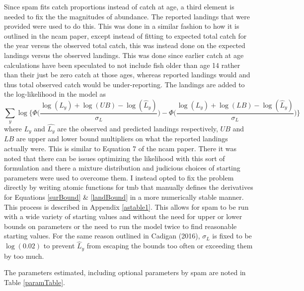 \documentclass[11pt]{article}\usepackage[]{graphicx}\usepackage[]{color}
\begin{document}
Since \acrshort{spam} fits catch proportions instead of catch at age, a third element is needed to fix the the magnitudes of abundance. The reported landings that were provided were used to do this. This was done in a similar fashion to how it is outlined in the \acrshort{ncam} paper, except instead of fitting to expected total catch for the year versus the observed total catch, this was instead done on the expected landings versus the observed landings. This was done since earlier catch at age calculations have been speculated to not include fish older than age 14 rather than their just be zero catch at those ages, whereas reported landings would and thus total observed catch would be under-reporting. The landings are added to the log-likelihood in the model as
\begin{equation}\label{landBound}
  \sum_y \log\bigg\{\Phi\bigg(\frac{\log(L_y) + \log(UB)	- \log(\hat{L}_y)}{\sigma_L}\bigg)-\Phi\bigg(\frac{\log(L_y) + \log(LB)	- \log(\hat{L}_y)}{\sigma_L}\bigg)\bigg\}
\end{equation}
where $L_y$ and $\hat{L_y}$ are the observed and predicted landings respectively, $UB$ and $LB$ are upper and lower bound multipliers on what the reported landings actually were. This is similar to Equation 7 of the \acrshort{ncam} paper. There it was noted that there can be issues optimizing the likelihood with this sort of formulation and there a mixture distribution and judicious choices of starting parameters were used to overcome them\cite{Cadigan2016A-state-space-s}. I instead opted to fix the problem directly by writing atomic functions for \acrshort{tmb} that manually defines the derivatives for Equations \ref{surBound} \& \ref{landBound} in a more numerically stable manner. This process is described in Appendix \ref{astable1}. This allows for \acrshort{spam} to be run with a wide variety of starting values and without the need for upper or lower bounds on parameters or the need to run the model twice to find reasonable starting values. For the same reason outlined in Cadigan (2016)\cite{Cadigan2016A-state-space-s}, $\sigma_L$ is fixed to be $\log(0.02)$ to prevent $\hat{L}_y$ from escaping the bounds too often or exceeding them by too much. 


The parameters estimated, including optional parameters by \acrshort{spam} are noted in Table \ref{paramTable}.
\end{document}
